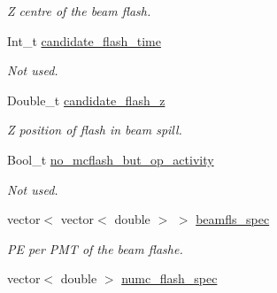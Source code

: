 \begin{DoxyCompactItemize}
\begin{DoxyCompactList}\small\item\em Z centre of the beam flash. \end{DoxyCompactList}\item 
\hypertarget{classUBXSecEvent_a84ab9cf932fabd0e1d9762ac07c75407}{Int\-\_\-t \hyperlink{classUBXSecEvent_a84ab9cf932fabd0e1d9762ac07c75407}{candidate\-\_\-flash\-\_\-time}}\label{classUBXSecEvent_a84ab9cf932fabd0e1d9762ac07c75407}

\begin{DoxyCompactList}\small\item\em Not used. \end{DoxyCompactList}\item 
\hypertarget{classUBXSecEvent_af5f3d50c4b146e63f9cf72d15ec1a958}{Double\-\_\-t \hyperlink{classUBXSecEvent_af5f3d50c4b146e63f9cf72d15ec1a958}{candidate\-\_\-flash\-\_\-z}}\label{classUBXSecEvent_af5f3d50c4b146e63f9cf72d15ec1a958}

\begin{DoxyCompactList}\small\item\em Z position of flash in beam spill. \end{DoxyCompactList}\item 
\hypertarget{classUBXSecEvent_a04fd3fd872cbe4f19ea0c438214ee854}{Bool\-\_\-t \hyperlink{classUBXSecEvent_a04fd3fd872cbe4f19ea0c438214ee854}{no\-\_\-mcflash\-\_\-but\-\_\-op\-\_\-activity}}\label{classUBXSecEvent_a04fd3fd872cbe4f19ea0c438214ee854}

\begin{DoxyCompactList}\small\item\em Not used. \end{DoxyCompactList}\item 
\hypertarget{classUBXSecEvent_a672e817e5a574c0a1ff50ec81862bc1f}{vector$<$ vector$<$ double $>$ $>$ \hyperlink{classUBXSecEvent_a672e817e5a574c0a1ff50ec81862bc1f}{beamfls\-\_\-spec}}\label{classUBXSecEvent_a672e817e5a574c0a1ff50ec81862bc1f}

\begin{DoxyCompactList}\small\item\em P\-E per P\-M\-T of the beam flashe. \end{DoxyCompactList}\item 
\hypertarget{classUBXSecEvent_aa51dba44fd0d9dcfbeb4c455b73debbd}{vector$<$ double $>$ \hyperlink{classUBXSecEvent_aa51dba44fd0d9dcfbeb4c455b73debbd}{numc\-\_\-flash\-\_\-spec}}\label{classUBXSecEvent_aa51dba44fd0d9dcfbeb4c455b73debbd}


\end{DoxyCompactItemize}
